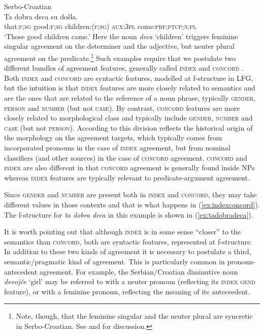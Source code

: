 \documentclass[output=paper,hidelinks]{langscibook}
\begin{document}
\ea\label{ex:indexconcord}Serbo-Croatian\\
\gll Ta dobra deca su došla.\\
that:\textsc{f;sg} good:\textsc{f;sg} children:(\textsc{f;sg}) \textsc{aux;3pl} come:\textsc{prf;ptcp;n;pl}\\
\glt `Those good children came.'
\z
Here the noun \textit{deca} `children' triggers feminine singular
agreement on the determiner and the adjective, but neuter plural
agreement on the predicate.\footnote{Note, though, that the feminine singular and the neuter plural are syncretic in Serbo-Croatian. See \textcite{Alsina:Two,Alsina:Third} and \textcite{Wechsler:Wrong} for discussion.}  Such examples require that we postulate
two different bundles of agreement features, generally called
\textsc{index} and \textsc{concord}
\citep{pollard1994head-driven,Kathol:Agreement,WechslerZlatic:Agreement2003}. Both
\textsc{index} and \textsc{concord} are syntactic features, modelled
at f-structure in LFG, but the intuition is that \textsc{index}
features are more closely related to semantics and are the ones that are
related to the reference of a noun phrase, typically \textsc{gender,
  person} and \textsc{number} (but not \textsc{case}). By contrast, \textsc{concord} features
are more closely related to morphological class and typically include
\textsc{gender, number} and \textsc{case} (but not \textsc{person}). According to
\textcite{Wechsler:Mixed} this division reflects the historical origin
of the morphology on the agreement targets, which typically comes from
incorporated pronouns in the case of \textsc{index} agreement, but
from nominal classifiers (and other sources) in the case of
\textsc{concord} agreement. \textsc{concord} and \textsc{index} are
also different in that \textsc{concord} agreement is generally found
inside NPs whereas \textsc{index} features are typically relevant to
predicate-argument agreement.

Since \textsc{gender} and \textsc{number}
are present both in \textsc{index} and \textsc{concord}, they may take
different values in those contexts and that is what happens in
(\ref{ex:indexconcord}). The f-structure for \textit{ta dobra deca} in
this example is shown in (\ref{ex:tadobradeca}).

%
It is worth pointing out that although \textsc{index} is in some sense
“closer” to the semantics than \textsc{concord}, both are syntactic
features, represented at f-structure. In addition to these two kinds
of agreement it is necessary to postulate a third, semantic/pragmatic
kind of agreement. This is particularly common in pronoun-antecedent
agreement. For example, the Serbian/Croatian diminutive noun
\textit{devoj\v{c}e} `girl' may be referred to with a neuter pronoun
(reflecting its \textsc{index gend} feature), or with a feminine
pronoun, reflecting the meaning of its anteceedent.
\end{document}
